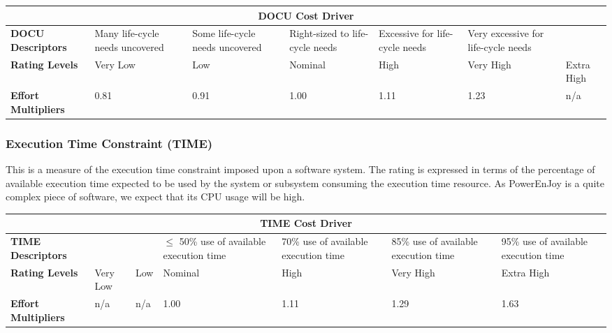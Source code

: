 \begin{table}[H]
	\centering
	\begin{tabular}{| m{1.8cm} | m{1.9cm} | m{1.7cm} | m{1.6cm} | m{1.6cm} | m{1.8cm} | m{0.9cm} | }
		\hline
		\multicolumn{7}{|c|}{ \textbf{DOCU Cost Driver} } \\
		\hline
		\hline
		\textbf{DOCU Descriptors} & Many life-cycle needs uncovered & Some life-cycle needs uncovered & Right-sized to life-cycle needs & Excessive for life-cycle needs & Very excessive for life-cycle needs & \\
		\hline
		\textbf{Rating Levels} & Very Low & Low & Nominal & High & Very High & Extra High \\
		\hline
		\textbf{Effort Multipliers} & 0.81 & 0.91 & 1.00 & 1.11 & 1.23 & n/a \\ 
		\hline
	\end{tabular}
\end{table} 
\newpage
\subsubsection*{Execution Time Constraint (TIME)}
This is a measure of the execution time constraint imposed upon a software system. The rating is expressed in terms of the percentage of available execution time expected to be used by the system or subsystem consuming the execution time resource. As PowerEnJoy is a quite complex piece of software, we expect that its CPU usage will be high.

\begin{table}[H]
	\centering
	\begin{tabular}{| m{1.8cm} | m{0.8cm} | m{0.8cm} | m{1.8cm} | m{1.8cm} | m{1.8cm} | m{1.8cm} | }
		\hline
		\multicolumn{7}{|c|}{ \textbf{TIME Cost Driver} } \\
		\hline
		\hline
		\textbf{TIME Descriptors} & & & \(\leq\) 50\% \newline use of \newline available execution time & 70\% use of available execution time & 85\% use of available execution time & 95\% use of available execution time\\
		\hline
		\textbf{Rating Levels} & Very Low & Low & Nominal & High & Very High & Extra High \\
		\hline
		\textbf{Effort Multipliers} & n/a & n/a & 1.00 & 1.11 & 1.29 & 1.63 \\ 
		\hline
	\end{tabular}
\end{table} 

